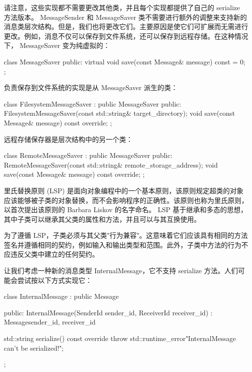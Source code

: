 请注意，这些实现都不需要更改其他类，并且每个实现都提供了自己的 serialize 方法版本。
MessageSender 和 MessageSaver 类不需要进行额外的调整来支持新的消息类层次结构。但是，我们也将更改它们。主要原因是使它们可扩展而无需进行更改。例如，消息不仅可以保存到文件系统，还可以保存到远程存储。在这种情况下， MessageSaver 变为纯虚拟的：

\begin{cpp}
class MessageSaver {
public:
    virtual void save(const Message& message) const = 0;
};
\end{cpp}

负责保存到文件系统的实现是从 MessageSaver 派生的类：

\begin{cpp}
class FilesystemMessageSaver : public MessageSaver {
    public:
    FilesystemMessageSaver(const std::string&
        target_directory);
    void save(const Message& message) const override;
};
\end{cpp}

远程存储保存器是层次结构中的另一个类：

\begin{cpp}
class RemoteMessageSaver : public MessageSaver {
public:
    RemoteMessageSaver(const std::string&
        remote_storage_address);
    void save(const Message& message) const override;
};
\end{cpp}


里氏替换原则 (LSP) 是面向对象编程中的一个基本原则，该原则规定超类的对象应该能够被子类的对象替换，而不会影响程序的正确性。该原则也称为里氏原则，以首次提出该原则的 Barbara Liskov 的名字命名。 LSP 基于继承和多态的思想，其中子类可以继承其父类的属性和方法，并且可以与其互换使用。

为了遵循 LSP，子类必须与其父类"行为兼容"。这意味着它们应该具有相同的方法签名并遵循相同的契约，例如输入和输出类型和范围。此外，子类中方法的行为不应违反父类中建立的任何契约。

让我们考虑一种新的消息类型 InternalMessage，它不支持 serialize 方法。人们可能会尝试按以下方式实现它：

\begin{cpp}
class InternalMessage : public Message {
public:
    InternalMessage(SenderId sender_id, ReceiverId
                    receiver_id)
        : Message{sender_id, receiver_id} {}

    std::string serialize() const override {
        throw std::runtime_error{"InternalMessage can't be
            serialized!"};
    }
};
\end{cpp}

